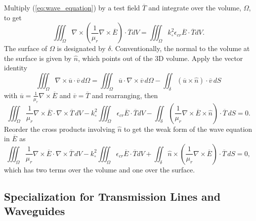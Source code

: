\documentclass[titlepage]{article}
\renewcommand\_{\textunderscore\linebreak[1]}
\begin{document}
Multiply (\ref{eq:wave_equation}) by a test field $\overline{T}$ and integrate over the volume, $\Omega$, to get 
\begin{equation}
\iiint_{\Omega}\nabla\times(\frac{1}{\mu_r}\nabla\times\overline{E})\cdot\overline{T}dV=\iiint_{\Omega} k_\circ^2\epsilon_{cr}\overline{E}\cdot\overline{T}dV.
\end{equation}
The surface of $\Omega$ is designated by $\delta$.  Conventionally, the normal to the volume at the surface is given by $\hat{n}$, which points out of the 3D volume.  Apply the vector identity
\begin{equation}
\iiint_{\Omega}\nabla\times\overline{u}\cdot\overline{v}\,d\Omega=\iiint_{\Omega}\overline{u}\cdot\nabla\times\overline{v}\,d\Omega-\iint_{\delta}(\overline{u}\times\hat{n})\cdot\overline{v}\,dS
\end{equation}
with $\overline{u}=\frac{1}{\mu_r}\nabla\times\overline{E}$ and $\overline{v}=\overline{T}$ and rearranging, then
\begin{equation}
\iiint_{\Omega}\frac{1}{\mu_r}\nabla\times\overline{E}\cdot\nabla\times\overline{T}\,dV-k_\circ^2\iiint_{\Omega}\epsilon_{cr}\overline{E}\cdot\overline{T}dV-\iint_{\delta}(\frac{1}{\mu_r}\nabla\times\overline{E}\times\hat{n})\cdot\overline{T}\,dS=0.
\end{equation}
Reorder the cross products involving $\hat{n}$ to get the weak form of the wave equation in $\overline{E}$ as
\begin{equation}
\label{eq:weak_form}
\iiint_{\Omega}\frac{1}{\mu_r}\nabla\times\overline{E}\cdot\nabla\times\overline{T}\,dV-k_\circ^2\iiint_{\Omega}\epsilon_{cr}\overline{E}\cdot\overline{T}dV+\iint_{\delta}\hat{n}\times(\frac{1}{\mu_r}\nabla\times\overline{E})\cdot\overline{T}\,dS=0,
\end{equation}
which has two terms over the volume and one over the surface. 

\subsection{Specialization for Transmission Lines and Waveguides}
\label{sec:specialization}
\end{document}
